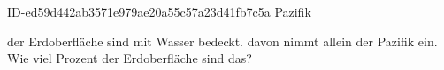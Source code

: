 \begin{exercise}
      {ID-ed59d442ab3571e979ae20a55c57a23d41fb7c5a}
      {Pazifik}
  \ifproblem\problem\par
     der Erdoberfläche sind mit Wasser bedeckt.  davon nimmt allein der
    Pazifik ein. Wie viel Prozent der Erdoberfläche sind das?
  \fi
\end{exercise}
